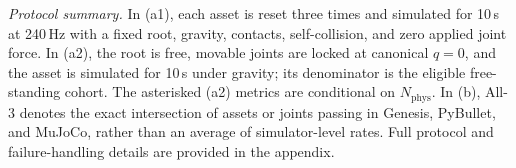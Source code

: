 \begin{table}[t]
  \vspace{3pt}
  \begin{minipage}{0.98\textwidth}
    \footnotesize
    \textit{Protocol summary.}
    In (a1), each asset is reset three times and simulated for 10\,s at 240\,Hz
    with a fixed root, gravity, contacts, self-collision, and zero applied
    joint force. In (a2), the root is free, movable joints are locked at
    canonical $q=0$, and the asset is simulated for 10\,s under gravity; its
    denominator is the eligible free-standing cohort. The asterisked (a2)
    metrics are conditional on $N_{\mathrm{phys}}$. In (b), All-3 denotes
    the exact intersection of assets or joints passing in Genesis, PyBullet,
    and MuJoCo, rather than an average of simulator-level rates. Full protocol
    and failure-handling details are provided in the appendix.
  \end{minipage}
\end{table}
